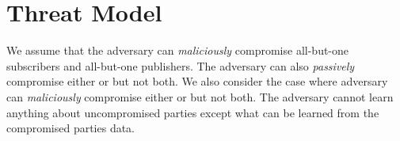 \section{Threat Model}
\label{sec:threatmodel}

We assume that the adversary can \emph{maliciously} compromise all-but-one
subscribers and all-but-one publishers. The adversary can also \emph{passively}
compromise either \broker or \garbler but not both. We also consider the case
where adversary can \emph{maliciously} compromise either \broker or \garbler
but not both. The adversary cannot learn anything about uncompromised parties
except what can be learned from the compromised parties data.  
